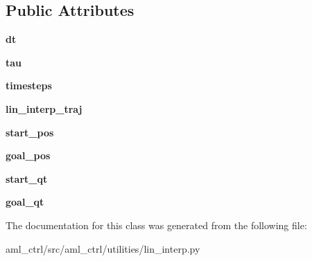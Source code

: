 \subsection*{Public Attributes}
\begin{DoxyCompactItemize}
\item 
\hypertarget{classaml__ctrl_1_1utilities_1_1lin__interp_1_1_lin_interp_a91ce8d62c538477b2e4e30cc604b9d60}{{\bfseries dt}}\label{classaml__ctrl_1_1utilities_1_1lin__interp_1_1_lin_interp_a91ce8d62c538477b2e4e30cc604b9d60}

\item 
\hypertarget{classaml__ctrl_1_1utilities_1_1lin__interp_1_1_lin_interp_a3a9296ff1896b9de1f43ebf138554658}{{\bfseries tau}}\label{classaml__ctrl_1_1utilities_1_1lin__interp_1_1_lin_interp_a3a9296ff1896b9de1f43ebf138554658}

\item 
\hypertarget{classaml__ctrl_1_1utilities_1_1lin__interp_1_1_lin_interp_a601fd091f2e367969d20dced930e84ca}{{\bfseries timesteps}}\label{classaml__ctrl_1_1utilities_1_1lin__interp_1_1_lin_interp_a601fd091f2e367969d20dced930e84ca}

\item 
\hypertarget{classaml__ctrl_1_1utilities_1_1lin__interp_1_1_lin_interp_a636787254c4170344140b25b54139782}{{\bfseries lin\-\_\-interp\-\_\-traj}}\label{classaml__ctrl_1_1utilities_1_1lin__interp_1_1_lin_interp_a636787254c4170344140b25b54139782}

\item 
\hypertarget{classaml__ctrl_1_1utilities_1_1lin__interp_1_1_lin_interp_af6583e2f56c7732af967927541ed01ce}{{\bfseries start\-\_\-pos}}\label{classaml__ctrl_1_1utilities_1_1lin__interp_1_1_lin_interp_af6583e2f56c7732af967927541ed01ce}

\item 
\hypertarget{classaml__ctrl_1_1utilities_1_1lin__interp_1_1_lin_interp_a2827d5e7e445519eb94643982b8fbe15}{{\bfseries goal\-\_\-pos}}\label{classaml__ctrl_1_1utilities_1_1lin__interp_1_1_lin_interp_a2827d5e7e445519eb94643982b8fbe15}

\item 
\hypertarget{classaml__ctrl_1_1utilities_1_1lin__interp_1_1_lin_interp_a8e59d6ea4a99b6ef7ed6a8acaac632d4}{{\bfseries start\-\_\-qt}}\label{classaml__ctrl_1_1utilities_1_1lin__interp_1_1_lin_interp_a8e59d6ea4a99b6ef7ed6a8acaac632d4}

\item 
\hypertarget{classaml__ctrl_1_1utilities_1_1lin__interp_1_1_lin_interp_ac042c31929df9c729e392ee7bc72a84a}{{\bfseries goal\-\_\-qt}}\label{classaml__ctrl_1_1utilities_1_1lin__interp_1_1_lin_interp_ac042c31929df9c729e392ee7bc72a84a}

\end{DoxyCompactItemize}


The documentation for this class was generated from the following file\-:\begin{DoxyCompactItemize}
\item 
aml\-\_\-ctrl/src/aml\-\_\-ctrl/utilities/lin\-\_\-interp.\-py\end{DoxyCompactItemize}
